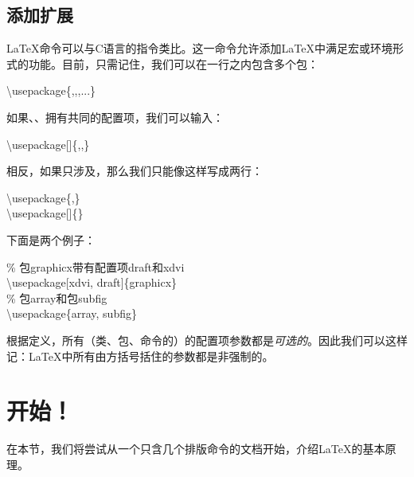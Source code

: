 \subsection{添加扩展}

\LaTeX 命令可以与C语言的指令类比。这一命令允许添加\LaTeX 中满足宏或环境形式的功能。目前，只需记住，我们可以在一行之内包含多个包：

\begin{dmd}
    \backslash usepackage\{,,,...\}
\end{dmd}

如果、、拥有共同的配置项，我们可以输入：

\begin{dmd}
    \backslash usepackage[]\{,,\}
\end{dmd}

相反，如果只涉及，那么我们只能像这样写成两行：

\begin{dmd}
    \backslash usepackage\{,\}\\
    \backslash usepackage[]\{\}
\end{dmd}

下面是两个例子：

\begin{dmd}
    \% 包graphicx带有配置项draft和xdvi\\
    \backslash usepackage[xdvi, draft]\{graphicx\}\\
    \% 包array和包subfig\\
    \backslash usepackage\{array, subfig\}
\end{dmd}

\begin{exclamation}
    根据定义，所有（类、包、命令的）的配置项参数都是\textit{可选的}。因此我们可以这样记：\LaTeX 中所有由方括号括住的参数\dm{[...]}都是非强制的。
\end{exclamation}

\section{开始！}

在本节，我们将尝试从一个只含几个排版命令的文档开始，介绍\LaTeX 的基本原理。

